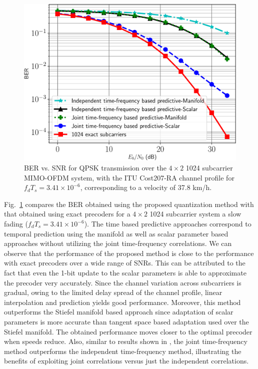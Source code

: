 \documentclass[journal,10pt,twocolumn]{IEEEtran}
\begin{document}
\begin{figure}
\begin{center}
\includegraphics[width=0.71\columnwidth]{images/1024final_withtime}
\caption{BER vs. SNR for QPSK transmission over the $4\times 2$ 1024
  subcarrier MIMO-OFDM system, with the ITU Cost207-RA channel profile
  for $f_dT_s = 3.41\times 10^{-6}$, corresponding to a velocity of 37.8 km/h.}
\label{fig:ber_ped}
\end{center}
\end{figure}

Fig.~\ref{fig:ber_ped} compares the BER obtained using the proposed
quantization method with that obtained using exact precoders for a
$4\times 2$ 1024 subcarrier system a slow fading
($f_dT_s = 3.41 \times 10^{-6}$). The time based predictive approaches
correspond to temporal prediction using the manifold as well as scalar
parameter based approaches without utilizing the joint time-frequency
correlations. We can observe that the performance of the proposed
method is close to the performance with exact precoders over a wide
range of SNRs. This can be attributed to the fact that even the 1-bit
update to the scalar parameters is able to approximate the precoder
very accurately. Since the channel variation across subcarriers is
gradual, owing to the limited delay spread of the channel profile,
linear interpolation and prediction yields good performance. Moreover,
this method outperforms the Stiefel manifold based approach since
adaptation of scalar parameters is more accurate than tangent space
based adaptation used over the Stiefel manifold. The obtained
performance moves closer to the optimal precoder when speeds reduce.
Also, similar to results shown in \cite{Gupt1905:Predictive}, the
joint time-frequency method outperforms the independent time-frequency
method, illustrating the benefits of exploiting joint correlations
versus just the independent correlations.
\end{document}
